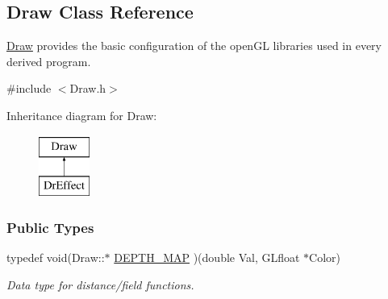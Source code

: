 \hypertarget{classDraw}{\subsection{\-Draw \-Class \-Reference}
\label{classDraw}
}


\hyperlink{classDraw}{\-Draw} provides the basic configuration of the open\-G\-L libraries used in every derived program.  




{\ttfamily \#include $<$\-Draw.\-h$>$}

\-Inheritance diagram for \-Draw\-:\begin{figure}[H]
\begin{center}
\leavevmode
\includegraphics[height=2.000000cm]{classDraw}
\end{center}
\end{figure}
\subsubsection*{\-Public \-Types}
\begin{DoxyCompactItemize}
\item 
\hypertarget{classDraw_af1513ca0f3e04442fc69e97a85ade56e}{typedef void(\-Draw\-::$\ast$ \hyperlink{classDraw_af1513ca0f3e04442fc69e97a85ade56e}{\-D\-E\-P\-T\-H\-\_\-\-M\-A\-P} )(double \-Val, \-G\-Lfloat $\ast$\-Color)}\label{classDraw_af1513ca0f3e04442fc69e97a85ade56e}

\begin{DoxyCompactList}\small\item\em \-Data type for distance/field functions. \end{DoxyCompactList}\end{DoxyCompactItemize}
